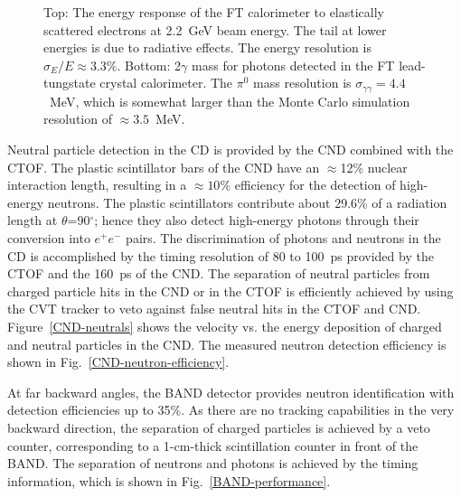 \documentclass[final,3p]{elsarticle}
\begin{document}
\begin{twocolumn}
\begin{figure}[t!]
\caption{Top: The energy response of the FT calorimeter to elastically scattered electrons at 2.2~GeV beam energy.
  The tail at lower energies is due to radiative effects. The energy resolution is $\sigma_E / E \approx 3.3\%$. Bottom:
  2$\gamma$ mass for photons detected in the FT lead-tungstate crystal calorimeter. The $\pi^0$ mass resolution is
  $\sigma_{\gamma\gamma} = 4.4$~MeV, which is somewhat larger than the Monte Carlo simulation resolution of
  $\approx 3.5$~MeV.}
\label{FT-en-gg}
\end{figure}

Neutral particle detection in the CD is provided by the CND combined with the CTOF. The plastic scintillator bars
of the CND have an $\approx$12\% nuclear interaction length, resulting in a $\approx 10\%$ efficiency for the
detection of high-energy neutrons. The plastic scintillators contribute about 29.6\% of a radiation length at
$\theta$=90$^\circ$; hence they also detect high-energy photons through their conversion into $e^+e^-$ pairs. The
discrimination of photons and neutrons in the CD is accomplished by the timing resolution of 80 to 100~ps provided by
the CTOF and the 160~ps of the CND. The separation of neutral particles from charged particle hits in the CND or in
the CTOF is efficiently achieved by using the CVT tracker to veto against false neutral hits in the CTOF and CND.
Figure~\ref{CND-neutrals} shows the velocity vs. the energy deposition of charged and neutral particles in the
CND. The measured neutron detection efficiency is shown in Fig.~\ref{CND-neutron-efficiency}.

At far backward angles, the BAND detector provides neutron identification with detection efficiencies up to 35\%. As
there are no tracking capabilities in the very backward direction, the separation of charged particles is achieved by a
veto counter, corresponding to a 1-cm-thick scintillation counter in front of the BAND. The separation of neutrons and
photons is achieved by the timing information, which is shown in Fig.~\ref{BAND-performance}.   


\end{twocolumn}
\end{document}
